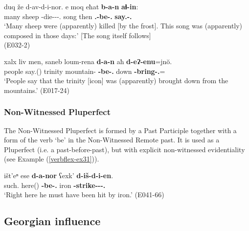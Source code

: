 \begin{exe}
	\ex\label{verbflex-ex30}
	\begin{xlist}
		
		
			\ex\label{verbflex-ex30a}
			\gll duq že d-av-d-i-nor. e moq eħat \textbf{b-a-n} \textbf{aɬ-in}: \\
			many sheep {\D}-die-{\D}-{\Tr}-{\Nw}.{\Rem} {\Prox} song then \textbf{{\B}.{\Sg}-be-{\Nw}.{\Aor}} \textbf{say.{\Pfv}-{\Ptcp}.{\Pst} }\\
			\trans `Many sheep were (apparently) killed [by the frost]. This song was (apparently) composed in those days:' [The song itself follows] \\
			\hfill (E032-2)
		
		
		
			\ex\label{verbflex-ex30b}
			\gll xalx liv men, saneb loum-rena \textbf{d-a-n} aħ \textbf{d-eɁ-enu}=jn\u{o}. \\
			people say.{\Ipfv}({\Npst}) {\Subord} trinity mountain-{\Abl} \textbf{{\D}-be-{\Nw}.{\Aor}} down \textbf{{\D}-bring-{\Ptcp}.{\Pst}}={\Quot} \\
			\trans `People say that the trinity [icon] was (apparently) brought down from the mountains.'
			\hfill (E017-24)
		
		
	\end{xlist}
\end{exe}

\subsubsection{Non-Witnessed Pluperfect}

The Non-Witnessed Pluperfect is formed by a Past Participle together with a form of the verb `be' in the Non-Witnessed Remote past. It is used as a Pluperfect (i.e. a past-before-past), but with explicit non-witnessed evidentiality (see Example (\ref{verbflex-ex31})).


\begin{exe}
	\ex\label{verbflex-ex31}
	
	\gll išt'eⁿ ese \textbf{d-a-nor} ʕexk' \textbf{d-iš-d-i-en}. \\
	such.{\Prox} here({\Ess}) \textbf{{\D}-be-{\Nw}.{\Rem}} iron \textbf{{\D}-strike-{\D}-{\Tr}-{\Ptcp}.{\Pst}} \\
	\trans `Right here he must have been hit by iron.'
	\hfill (E041-66)
	
\end{exe}

\subsection{Georgian influence} \label{evidgeo}

